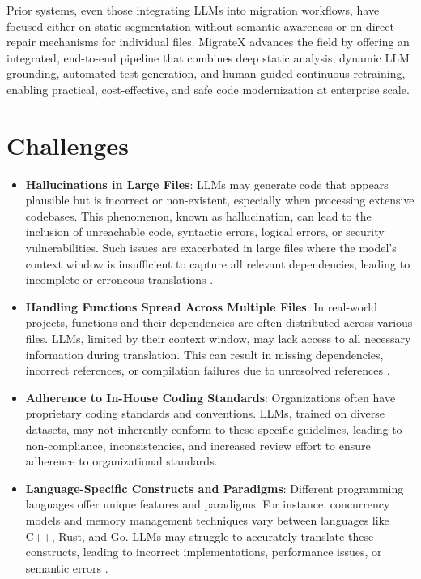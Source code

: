 \documentclass[twocolumn]{article}
\begin{document}
Prior systems, even those integrating LLMs into migration workflows, have focused either on static segmentation without semantic awareness or on direct repair mechanisms for individual files. MigrateX advances the field by offering an integrated, end-to-end pipeline that combines deep static analysis, dynamic LLM grounding, automated test generation, and human-guided continuous retraining, enabling practical, cost-effective, and safe code modernization at enterprise scale.
\endgroup

\section{Challenges}

\begin{itemize}
  \item \textbf{Hallucinations in Large Files}: LLMs may generate code that appears plausible but is incorrect or non-existent, especially when processing extensive codebases. This phenomenon, known as hallucination, can lead to the inclusion of unreachable code, syntactic errors, logical errors, or security vulnerabilities. Such issues are exacerbated in large files where the model's context window is insufficient to capture all relevant dependencies, leading to incomplete or erroneous translations \cite{window} \cite{token} \cite{levy2024same}.

  \item \textbf{Handling Functions Spread Across Multiple Files}: In real-world projects, functions and their dependencies are often distributed across various files. LLMs, limited by their context window, may lack access to all necessary information during translation. This can result in missing dependencies, incorrect references, or compilation failures due to unresolved references \cite{eniser2024towards}.

  \item \textbf{Adherence to In-House Coding Standards}: Organizations often have proprietary coding standards and conventions. LLMs, trained on diverse datasets, may not inherently conform to these specific guidelines, leading to non-compliance, inconsistencies, and increased review effort to ensure adherence to organizational standards.

  \item \textbf{Language-Specific Constructs and Paradigms}: Different programming languages offer unique features and paradigms. For instance, concurrency models and memory management techniques vary between languages like C++, Rust, and Go. LLMs may struggle to accurately translate these constructs, leading to incorrect implementations, performance issues, or semantic errors \cite{zhang2023ownership}.


\end{itemize}
\end{document}
